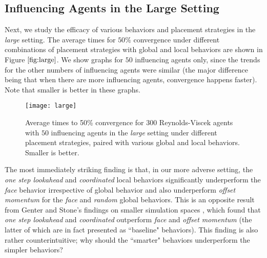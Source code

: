 \subsection{Influencing Agents in the Large Setting}
Next, we study the efficacy of various behaviors and placement strategies in
the \textit{large} setting.
The average times for $50\%$ convergence under different combinations of placement
strategies with global and local behaviors are shown in Figure $\ref{fig:large}$.
We show graphs for $50$ influencing agents only, since the trends for the other
numbers of influencing agents were similar (the major difference being that
when there are more influencing agents, convergence happens faster).
Note that smaller is better in these graphs.
\begin{figure}
    \texttt{[image: large]}
    \caption{Average times to 50\% convergence for $300$ Reynolds-Viscek agents
    with $50$ influencing agents in the \textit{large} setting under different
    placement strategies, paired with various global and local behaviors.
    Smaller is better.}
    \label{fig:large}
\end{figure}
The most immediately striking finding is that, in our more adverse setting,
the \textit{one step lookahead} and \textit{coordinated} local behaviors
significantly underperform the \textit{face} behavior irrespective of global
behavior and also underperform \textit{offset momentum} for the \textit{face}
and \textit{random} global behaviors.
This is an opposite result from Genter and Stone's findings on smaller simulation
spaces \cite{genter201612steplookahead, genterthesis}, which found that
\textit{one step lookahead} and \textit{coordinated} outperform \textit{face}
and \textit{offset momentum} (the latter of which are in fact presented as
``baseline" behaviors).
This finding is also rather counterintuitive; why should the ``smarter" behaviors
underperform the simpler behaviors?

